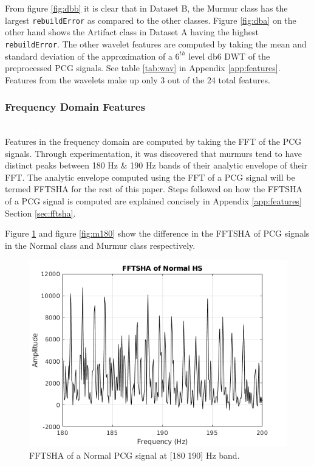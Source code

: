\documentclass[10pt,twocolumn]{witseiepaper}
\begin{document}
From figure \ref{fig:dbb} it is clear that in Dataset B, the Murmur class has the largest \texttt{rebuildError} as compared to the other classes. Figure \ref{fig:dba} on the other hand shows the Artifact class in Dataset A having the highest \texttt{rebuildError}. The other wavelet features are computed by taking the mean and standard deviation of the approximation of a $6^{th}$ level db6 DWT of the preprocessed PCG signals. See table \ref{tab:wav} in Appendix \ref{app:features}. Features from the wavelets make up only 3 out of the 24 total features.


\subsubsection{Frequency Domain Features}
\textcolor{white}{Ke ea ipitsang Jehova...}\\
Features in the frequency domain are computed by taking the FFT of the PCG signals. Through experimentation, it was discovered that murmurs tend to have distinct peaks between 180 Hz \& 190 Hz bands of their analytic envelope of their FFT. The analytic envelope computed using the FFT of a PCG signal will be termed FFTSHA for the rest of this paper. Steps followed on how the FFTSHA of a PCG signal is computed are explained concisely in Appendix \ref{app:features} Section \ref{sec:fftsha}. 

Figure \ref{fig:n180} and figure \ref{fig:m180} show the difference in the FFTSHA of PCG signals in the Normal class and Murmur class respectively.

\begin{figure}[h!]
    \centering
    \includegraphics[scale=0.45]{./fftsha_n.png}
    \caption{FFTSHA of a Normal PCG signal at [180 190] Hz band.}
    \label{fig:n180}
\end{figure}
\end{document}
